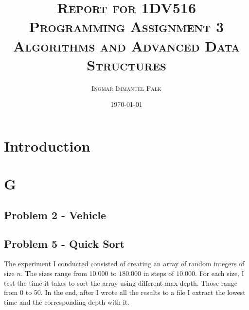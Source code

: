 \documentclass[12pt]{article}
\title{\textsc{Report for 1DV516 \\ Programming Assignment 3\\\large{Algorithms and Advanced Data Structures }}}
\author{\textsc{Ingmar Immanuel Falk}}
\date{\textsc{\today}}
\begin{document}
\maketitle
\pagebreak
\tableofcontents
\pagebreak

\section{Introduction}

\section{G}

\subsection{Problem 2 - Vehicle}
\subsection{Problem 5 - Quick Sort}

The experiment I conducted consisted of creating an array of random integers of size $n$. The sizes range from
$10.000$ to $180.000$ in steps of $10.000$. For each size, I test the time it takes to sort the array using different
max depth. Those range from 0 to 50. In the end, after I wrote all the results to a file I extract the lowest time
and the corresponding depth with it.
\end{document}
